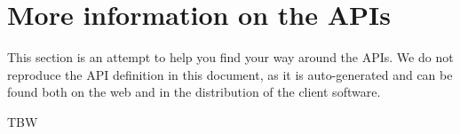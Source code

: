 \section{More information on the APIs}
\label{sec:apiinfo}

This section is an attempt to help you find your way around the
APIs. We do not reproduce the API definition in this document, as it
is auto-generated and can be found both on the web and in the
distribution of the client software.

TBW
